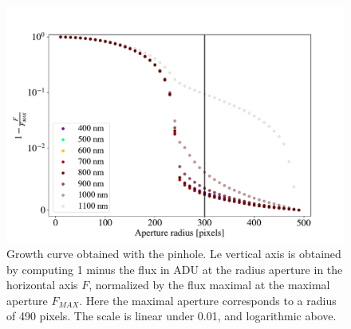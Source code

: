 
\begin{figure}[h]
    \centering
    \includegraphics[width=\columnwidth]{fig/growth_curve_5mm.pdf}
    \caption{Growth curve obtained with the \spinhole pinhole. Le vertical axis is obtained by computing 1 minus the flux in ADU at the radius aperture in the horizontal axis $F$, normalized by the flux maximal at the maximal aperture $F_{MAX}$. Here the maximal aperture corresponds to a radius of 490 pixels. The scale is linear under 0.01, and logarithmic above.}
    \label{fig:growth_5mm}    
\end{figure}

